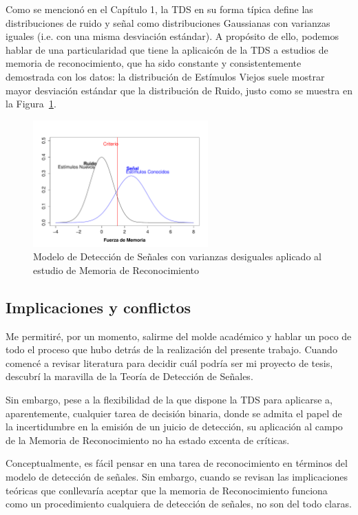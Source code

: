 Como se mencionó en el Capítulo 1, la TDS en su forma típica define las distribuciones de ruido y señal como distribuciones Gaussianas con varianzas iguales (i.e. con una misma desviación estándar). A propósito de ello, podemos hablar de una particularidad que tiene la aplicaicón de la TDS a estudios de memoria de reconocimiento, que ha sido constante y consistentemente demostrada con los datos: la distribución de Estímulos Viejos suele mostrar mayor desviación estándar que la distribución de Ruido, justo como se muestra en la Figura~\ref{fig:RM_SDT_2}.\\


\begin{figure}[th]
\centering
\includegraphics[width=0.60\textwidth]{Figures/RM_SDT_2} 
\decoRule
\caption[SDT en Memoria de Reconocimiento (Varianzas Desiguales)]{Modelo de Detección de Señales con varianzas desiguales aplicado al estudio de Memoria de Reconocimiento}
\label{fig:RM_SDT_2}
\end{figure}


\subsection{Implicaciones y conflictos}

Me permitiré, por un momento, salirme del molde académico y hablar un poco de todo el proceso que hubo detrás de la realización del presente trabajo. Cuando comencé a revisar literatura para decidir cuál podría ser mi proyecto de tesis, descubrí la maravilla de la Teoría de Detección de Señales. 

Sin embargo, pese a la flexibilidad de la que dispone la TDS para aplicarse a, aparentemente, cualquier tarea de decisión binaria, donde se admita el papel de la incertidumbre en la emisión de un juicio de detección, su aplicación al campo de la Memoria de Reconocimiento no ha estado excenta de críticas.

Conceptualmente, es fácil pensar en una tarea de reconocimiento en términos del modelo de detección de señales. Sin embargo, cuando se revisan las implicaciones teóricas que conllevaría aceptar que la memoria de Reconocimiento funciona como un procedimiento cualquiera de detección de señales, no son del todo claras. 

